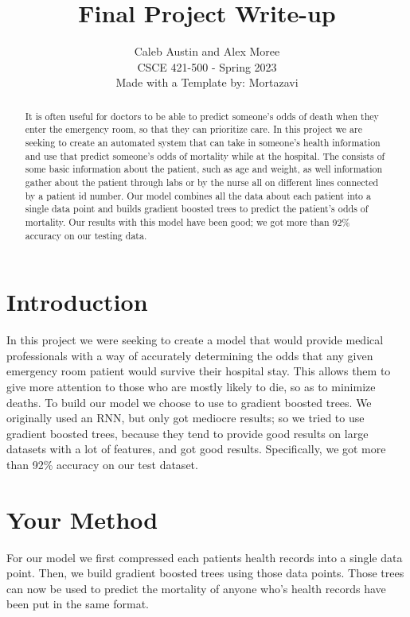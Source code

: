 \documentclass{article}
\title{Final Project Write-up}
\author{%
  Caleb Austin and Alex Moree\\
  CSCE 421-500 - Spring 2023\\
  Made with a Template by: Mortazavi
}
\begin{document}
\maketitle


\begin{abstract}
  It is often useful for doctors to be able to predict someone's odds of death when they enter the emergency room, so that they can prioritize care. In this project we are seeking to create an automated system that can take in someone's health information and use that predict someone's odds of mortality while at the hospital. The consists of some basic information about the patient, such as age and weight, as well information gather about the patient through labs or by the nurse all on different lines connected by a patient id number. Our model combines all the data about each patient into a single data point and builds gradient boosted trees to predict the patient's odds of mortality. Our results with this model have been good; we got more than 92\% accuracy on our testing data. 
\end{abstract}


\section{Introduction}

In this project we were seeking to create a model that would provide medical professionals with a way of accurately determining the odds that any given emergency room patient would survive their hospital stay. This allows them to give more attention to those who are mostly likely to die, so as to minimize deaths. To build our model we choose to use to gradient boosted trees. We originally used an RNN, but only got mediocre results; so we tried to use gradient boosted trees, because they tend to provide good results on large datasets with a lot of features, and got good results. Specifically, we got more than 92\% accuracy on our test dataset. 

\section{Your Method}

For our model we first compressed each patients health records into a single data point. Then, we build gradient boosted trees using those data points. Those trees can now be used to predict the mortality of anyone who's health records have been put in the same format. 
\end{document}
